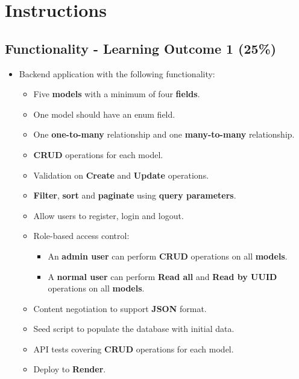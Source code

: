 \documentclass{article}
\begin{document}
\newpage

\section*{Instructions}

\subsection*{Functionality - Learning Outcome 1 (25\%)}
\begin{itemize}
	 \item Backend application with the following functionality:
	 \begin{itemize}
	 	\item Five \textbf{models} with a minimum of four \textbf{fields}.
		\item One model should have an enum field.
	 	\item One \textbf{one-to-many} relationship and one \textbf{many-to-many} relationship.
	 	\item \textbf{CRUD} operations for each model.
	 	\item Validation on \textbf{Create} and \textbf{Update} operations.
	 	\item \textbf{Filter}, \textbf{sort} and \textbf{paginate} using \textbf{query parameters}.
	 	\item Allow users to register, login and logout.
		\item Role-based access control:
		\begin{itemize}
			\item An \textbf{admin user} can perform \textbf{CRUD} operations on all \textbf{models}.
			\item A \textbf{normal user} can perform \textbf{Read all} and \textbf{Read by UUID} operations on all \textbf{models}. 
		\end{itemize}
		\item Content negotiation to support \textbf{JSON} format.
		\item Seed script to populate the database with initial data.
		\item API tests covering \textbf{CRUD} operations for each model.
		\item Deploy to \textbf{Render}.
	 \end{itemize}


\end{itemize}
\end{document}
